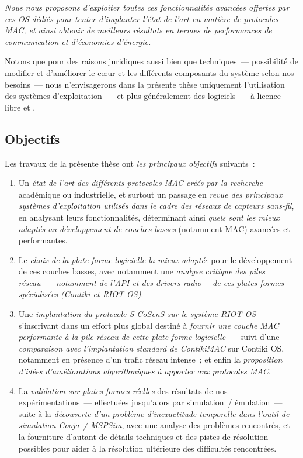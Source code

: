 \emph{Nous nous proposons d'exploiter toutes ces fonctionnalités avancées
offertes par ces OS dédiés pour tenter d'implanter l'état de l'art en matière
de protocoles MAC, et ainsi obtenir de meilleurs résultats en termes de
performances de communication et d'économies d'énergie.}

\medskip

Notons que pour des raisons juridiques aussi bien que techniques~---
possibilité de modifier et d'améliorer le c{\oe}ur et les différents
composants du système selon nos besoins~--- nous n'envisagerons dans
la présente thèse uniquement l'utilisation des systèmes d'exploitation~---
et plus généralement des logiciels~--- à licence libre et .


\subsection*{Objectifs}

Les travaux de la présente thèse ont \emph{les principaux objectifs}
suivants~:

\begin{enumerate}

\item Un \emph{état de l'art des différents protocoles MAC créés par la
recherche} académique ou industrielle, et surtout un passage en \emph{revue
des principaux systèmes d'exploitation utilisés dans le cadre des réseaux
de capteurs sans-fil}, en analysant leurs fonctionnalités, déterminant ainsi
\emph{quels sont les mieux adaptés au développement de couches basses}
(notamment MAC) avancées et performantes.

\item Le \emph{choix de la plate-forme logicielle la mieux adaptée} pour
le développement de ces couches basses, avec notamment une \emph{analyse
critique des piles réseau~--- notamment de l'API et des drivers radio---
de ces plates-formes spécialisées (Contiki et RIOT OS)}.

\item Une \emph{implantation du protocole S-CoSenS sur le système RIOT OS}~---
s'inscrivant dans un effort plus global destiné à \emph{fournir une couche
MAC performante à la pile réseau de cette plate-forme logicielle}~--- suivi
d'une \emph{comparaison avec l'implantation standard de ContikiMAC} sur
Contiki OS, notamment en présence d'un trafic réseau intense~; et enfin
la \emph{proposition d'idées d'améliorations algorithmiques à apporter
aux protocoles MAC}.

\item La \emph{validation sur plates-formes réelles} des résultats de nos
expérimentations~--- effectuées jusqu'alors par simulation~/ émulation~---
suite à la \emph{découverte d'un problème d'inexactitude temporelle dans
l'outil de simulation Cooja~/ MSPSim}, avec une analyse des problèmes
rencontrés, et la fourniture d'autant de détails techniques et des pistes
de résolution possibles pour aider à la résolution ultérieure des
difficultés rencontrées.

\end{enumerate}

